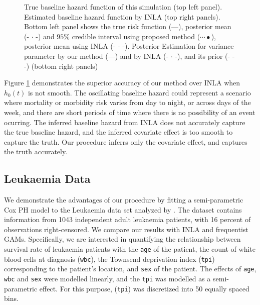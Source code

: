 \documentclass[]{article}
\begin{document}
\begin{figure}[ht]
{}
\caption{True baseline hazard function of this simulation (top left panel). Estimated baseline hazard function by INLA (top right panels). Bottom left panel shows the true risk function (---), posterior mean (- $\cdot$ -) and $95\%$ credible interval using proposed method ($\cdots•$), posterior mean using INLA (- - -). Posterior Estimation for variance parameter by our method (---) and by INLA (- $\cdot$ -), and its prior (- - -)  (bottom right panels)}
\label{fig:simulation}
\end{figure}

Figure \ref{fig:simulation} demonstrates the superior accuracy of our method over INLA when $h_{0}(t)$ is not smooth. The oscillating baseline hazard could represent a scenario where mortality or morbidity risk varies from day to night, or across days of the week, and there are short periods of time where there is no possibility of an event ocurring. The inferred baseline hazard from INLA does not accurately capture the true baseline hazard, and the inferred covariate effect is too smooth to capture the truth. Our procedure inferrs only the covariate effect, and captures the truth accurately.

\subsection{Leukaemia Data}

We demonstrate the advantages of our procedure by fitting a semi-parametric Cox PH model to the Leukaemia data set analyzed by \citet{inlacoxph}. The dataset contains information from 1043 independent adult leukaemia patients, with 16 percent of observations right-censored. We compare our results with INLA and frequentist GAMs. Specifically, we are interested in quantifying the relationship between survival rate of leukaemia patients with the \texttt{age} of the patient, the count of white blood cells at diagnosis (\texttt{wbc}), the Townsend deprivation index (\texttt{tpi}) corresponding to the patient's location, and \texttt{sex} of the patient. The effects of \texttt{age}, \texttt{wbc} and \texttt{sex} were modelled linearly, and the \texttt{tpi} was modelled as a semi-parametric effect. For this purpose, (\texttt{tpi}) was discretized into 50 equally spaced bins.
\end{document}
